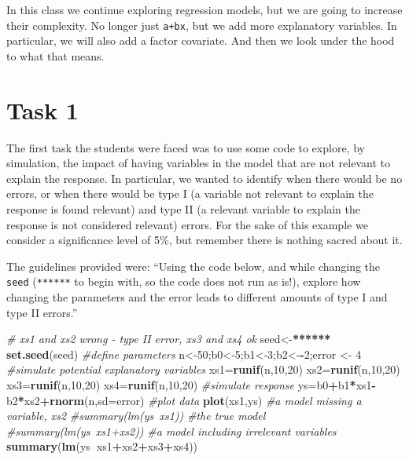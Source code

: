 \documentclass[
]{book}
\newenvironment{Shaded}{\begin{snugshade}}{\end{snugshade}}
\newcommand{\CommentTok}[1]{\textcolor[rgb]{0.56,0.35,0.01}{\textit{#1}}}
\newcommand{\DataTypeTok}[1]{\textcolor[rgb]{0.13,0.29,0.53}{#1}}
\newcommand{\DecValTok}[1]{\textcolor[rgb]{0.00,0.00,0.81}{#1}}
\newcommand{\ErrorTok}[1]{\textcolor[rgb]{0.64,0.00,0.00}{\textbf{#1}}}
\newcommand{\KeywordTok}[1]{\textcolor[rgb]{0.13,0.29,0.53}{\textbf{#1}}}
\newcommand{\NormalTok}[1]{#1}
\newcommand{\OperatorTok}[1]{\textcolor[rgb]{0.81,0.36,0.00}{\textbf{#1}}}
\newcommand{\StringTok}[1]{\textcolor[rgb]{0.31,0.60,0.02}{#1}}
\begin{document}
In this class we continue exploring regression models, but we are going to increase their complexity. No longer just \texttt{a+bx}, but we add more explanatory variables. In particular, we will also add a factor covariate. And then we look under the hood to what that means.

\hypertarget{task-1}{%
\section{Task 1}\label{task-1}}

The first task the students were faced was to use some code to explore, by simulation, the impact of having variables in the model that are not relevant to explain the response. In particular, we wanted to identify when there would be no errors, or when there would be type I (a variable not relevant to explain the response is found relevant) and type II (a relevant variable to explain the response is not considered relevant) errors. For the sake of this example we consider a significance level of 5\%, but remember there is nothing sacred about it.

The guidelines provided were: ``Using the code below, and while changing the \texttt{seed} (\texttt{******} to begin with, so the code does not run as is!), explore how changing the parameters and the error leads to different amounts of type I and type II errors.''

\begin{Shaded}
\begin{Highlighting}[]
\CommentTok{# xs1 and xs2 wrong - type II error, xs3 and xs4 ok}
\NormalTok{seed<-}\ErrorTok{******}
\KeywordTok{set.seed}\NormalTok{(seed)}
\CommentTok{#define parameters}
\NormalTok{n<-}\DecValTok{50}\NormalTok{;b0<-}\DecValTok{5}\NormalTok{;b1<-}\DecValTok{3}\NormalTok{;b2<-}\OperatorTok{-}\DecValTok{2}\NormalTok{;error <-}\StringTok{ }\DecValTok{4}
\CommentTok{#simulate potential explanatory variables}
\NormalTok{xs1=}\KeywordTok{runif}\NormalTok{(n,}\DecValTok{10}\NormalTok{,}\DecValTok{20}\NormalTok{)}
\NormalTok{xs2=}\KeywordTok{runif}\NormalTok{(n,}\DecValTok{10}\NormalTok{,}\DecValTok{20}\NormalTok{)}
\NormalTok{xs3=}\KeywordTok{runif}\NormalTok{(n,}\DecValTok{10}\NormalTok{,}\DecValTok{20}\NormalTok{)}
\NormalTok{xs4=}\KeywordTok{runif}\NormalTok{(n,}\DecValTok{10}\NormalTok{,}\DecValTok{20}\NormalTok{)}
\CommentTok{#simulate response}
\NormalTok{ys=b0}\OperatorTok{+}\NormalTok{b1}\OperatorTok{*}\NormalTok{xs1}\OperatorTok{-}\NormalTok{b2}\OperatorTok{*}\NormalTok{xs2}\OperatorTok{+}\KeywordTok{rnorm}\NormalTok{(n,}\DataTypeTok{sd=}\NormalTok{error)}
\CommentTok{#plot data}
\KeywordTok{plot}\NormalTok{(xs1,ys)}
\CommentTok{#a model missing a variable, xs2}
\CommentTok{#summary(lm(ys~xs1))}
\CommentTok{#the true model}
\CommentTok{#summary(lm(ys~xs1+xs2))}
\CommentTok{#a model including irrelevant variables}
\KeywordTok{summary}\NormalTok{(}\KeywordTok{lm}\NormalTok{(ys}\OperatorTok{~}\NormalTok{xs1}\OperatorTok{+}\NormalTok{xs2}\OperatorTok{+}\NormalTok{xs3}\OperatorTok{+}\NormalTok{xs4))}
\end{Highlighting}
\end{Shaded}
\end{document}
